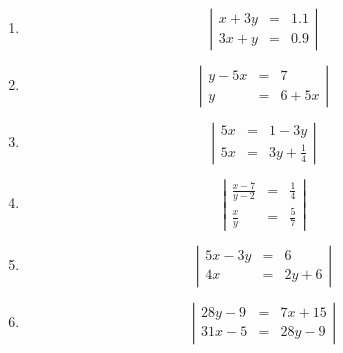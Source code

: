 \documentclass[%
11pt,%
twoside,%
titlepage,%
german,%
]{scrartcl}
\begin{document}
\begin{enumerate}
\begin{enumerate}
  \item 
    \begin{displaymath}
      \left| 
        \begin{array}{rcl}
        x+3y & = & 1.1 \\
        3x+y & = & 0.9
        \end{array} \right|
    \end{displaymath}

  \item 
    \begin{displaymath}
      \left| 
        \begin{array}{rcl}
         y-5x & = & 7 \\
          y & = & 6+5x
        \end{array} \right|
    \end{displaymath}

  \item 
    \begin{displaymath}
      \left| 
        \begin{array}{rcl}
         5x & = & 1-3y \\
         5x & = & 3y+\frac{1}{4}
        \end{array} \right|
    \end{displaymath}

  \item 
    \begin{displaymath}
      \left| 
        \begin{array}{rcl}
         \frac{x-7}{y-2} & = & \frac{1}{4} \\
          \frac{x}{y} & = & \frac{5}{7}
        \end{array} \right|
    \end{displaymath}

  \item 
    \begin{displaymath}
      \left| 
        \begin{array}{rcl}
         5x-3y & = & 6 \\
         4x & = & 2y+6
        \end{array} \right|
    \end{displaymath}

  \item 
    \begin{displaymath}
      \left| 
        \begin{array}{rcl}
         28y-9 & = & 7x+15 \\
         31x-5 & = & 28y-9
        \end{array} \right|
    \end{displaymath}



\end{enumerate}
\end{enumerate}
\end{document}
